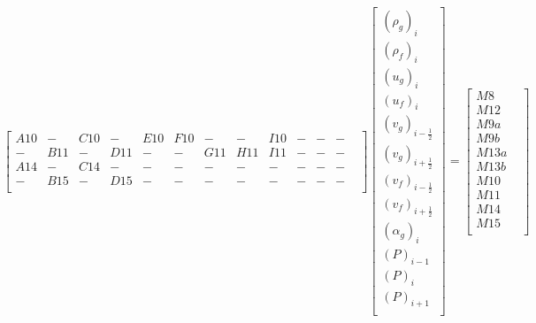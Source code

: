 \documentclass[11pt,letterpaper,titlepage]{article}
\newcommand{\half}{\frac{1}{2}}
\begin{document}
\begin{landscape}
\begin{equation*}
\begin{aligned}
\begin{bmatrix}
A10  & -    & C10  & -    & E10  & F10  & -    & -    & I10  & -    & -    & -   & \\ 
-    & B11  & -    & D11  & -    & -    & G11  & H11  & I11  & -    & -    & -   & \\ 
A14  & -    & C14  & -    & -    & -    & -    & -    & -    & -    & -    & -   & \\ 
-    & B15  & -    & D15  & -    & -    & -    & -    & -    & -    & -    & -   & \\ 
\end{bmatrix}
\begin{bmatrix}
(\rho_g)_i  \\
(\rho_f)_i  \\
(u_g)_i \\
(u_f)_i \\
(v_g)_{i-\half}\\
(v_g)_{i+\half}\\
(v_f)_{i-\half}  \\
(v_f)_{i+\half}   \\
(\alpha_g)_i  \\
(P)_{i-1}  \\
(P)_{i}  \\
(P)_{i+1}  \\
\end{bmatrix}
=
\begin{bmatrix}
M8   &\\ 
M12  &\\ 
M9a  &\\ 
M9b  &\\ 
M13a &\\ 
M13b &\\ 
M10  &\\ 
M11  &\\ 
M14  &\\
M15  &\\
\end{bmatrix}
\end{aligned}
\end{equation*}

\end{landscape}
\end{document}
